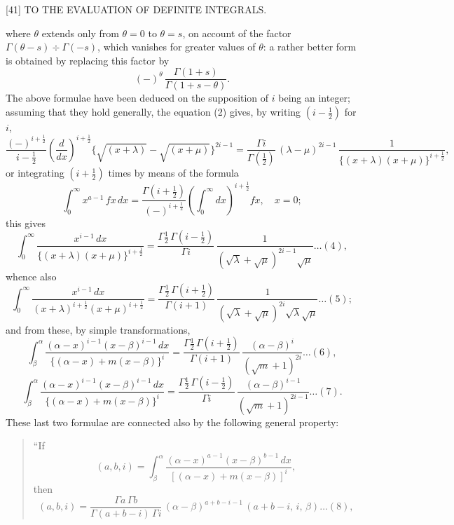 \documentclass[11pt]{article}
\begin{document}
\vspace{2em}

\begin{center}\small [41] \quad TO THE EVALUATION OF DEFINITE INTEGRALS. \end{center}

\noindent where $\theta$ extends only from $\theta=0$ to $\theta=s$, on account of the factor $\Gamma(\theta-s) \div \Gamma(-s)$, which vanishes for greater values of $\theta$: a rather better form is obtained by replacing this factor by
\[
  (-)^{\theta}\,\frac{\Gamma(1+s)}{\Gamma(1+s-\theta)}.
\]
The above formulae have been deduced on the supposition of $i$ being an integer; assuming that they hold generally, the equation (2) gives, by writing $(i-\tfrac{1}{2})$ for $i$,
\[
  \frac{(-)^{i+\tfrac{1}{2}}}{i-\tfrac{1}{2}}\!\left(\frac{d}{dx}\right)^{\!i+\tfrac{1}{2}}\!\{\sqrt{(x+\lambda)} - \sqrt{(x+\mu)}\}^{2i-1}
     = \frac{\Gamma i}{\Gamma(\tfrac{1}{2})}\,(\lambda-\mu)^{2i-1}\,\frac{1}{\{(x+\lambda)(x+\mu)\}^{i+\tfrac{1}{2}}},
\]
or integrating $(i+\tfrac{1}{2})$ times by means of the formula
\[
  \int_{0}^{\infty}\!x^{a-1}\,fx\,dx = \frac{\Gamma(i+\tfrac{1}{2})}{(-)^{i+\tfrac{1}{2}}}\!\left(\int_{0}^{\infty}\!dx\right)^{\!i+\tfrac{1}{2}}\!fx,\quad x = 0;
\]
this gives
\[
  \int_{0}^{\infty}\!\frac{x^{i-1}\,dx}{\{(x+\lambda)(x+\mu)\}^{i+\tfrac{1}{2}}}
     = \frac{\Gamma\tfrac{1}{2}\,\Gamma(i-\tfrac{1}{2})}{\Gamma i}\,\frac{1}{(\sqrt{\lambda}+\sqrt{\mu})^{2i-1}\sqrt{\mu}}\dots(4),
\]
whence also
\[
  \int_{0}^{\infty}\!\frac{x^{i-1}\,dx}{(x+\lambda)^{i+\tfrac{1}{2}}(x+\mu)^{i+\tfrac{1}{2}}}
     = \frac{\Gamma\tfrac{1}{2}\,\Gamma(i+\tfrac{1}{2})}{\Gamma(i+1)}\,\frac{1}{(\sqrt{\lambda}+\sqrt{\mu})^{2i}\sqrt{\lambda}\sqrt{\mu}}\dots(5);
\]
and from these, by simple transformations,
\[
  \int_{\beta}^{\alpha}\!\frac{(\alpha-x)^{i-1}(x-\beta)^{i-1}\,dx}{\{(\alpha-x) + m(x-\beta)\}^{i}}
     = \frac{\Gamma\tfrac{1}{2}\,\Gamma(i+\tfrac{1}{2})}{\Gamma(i+1)}\,\frac{(\alpha-\beta)^{i}}{(\sqrt{m}+1)^{2i}}\dots(6),
\]
\[
  \int_{\beta}^{\alpha}\!\frac{(\alpha-x)^{i-1}(x-\beta)^{i-1}\,dx}{\{(\alpha-x) + m(x-\beta)\}^{i}}
     = \frac{\Gamma\tfrac{1}{2}\,\Gamma(i-\tfrac{1}{2})}{\Gamma i}\,\frac{(\alpha-\beta)^{i-1}}{(\sqrt{m}+1)^{2i-1}}\dots(7).
\]
These last two formulae are connected also by the following general property:
\begin{quote}``If
\[
  (a,b,i) = \int_{\beta}^{\alpha}\!\frac{(\alpha-x)^{a-1}(x-\beta)^{b-1}\,dx}{[(\alpha-x) + m(x-\beta)]^{i}},
\]
then
\[
  (a,b,i) = \frac{\Gamma a\,\Gamma b}{\Gamma(a+b-i)\,\Gamma i}\,(\alpha-\beta)^{a+b-i-1}\,(a+b-i,\,i,\,\beta)\dots(8),
\]
\end{quote}
\end{document}
